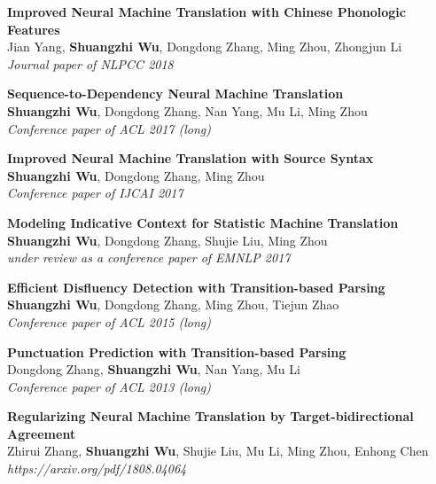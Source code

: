 \documentclass{resume}
\begin{document}
\normalsize \textbf{Improved Neural Machine Translation with Chinese Phonologic Features} \\
\small Jian Yang, \textbf{Shuangzhi Wu}, Dongdong Zhang, Ming Zhou, Zhongjun Li\\
\small \textit{Journal paper of NLPCC 2018}

\normalsize \textbf{Sequence-to-Dependency Neural Machine Translation} \\
\small \textbf{Shuangzhi Wu}, Dongdong Zhang, Nan Yang, Mu Li, Ming Zhou\\
\small \textit{Conference paper of ACL 2017 (long)}

\normalsize \textbf{Improved Neural Machine Translation with Source Syntax} \\
\small \textbf{Shuangzhi Wu}, Dongdong Zhang, Ming Zhou\\
\small \textit{Conference paper of IJCAI 2017}

\normalsize \textbf{Modeling Indicative Context for Statistic Machine Translation} \\
\small \textbf{Shuangzhi Wu}, Dongdong Zhang, Shujie Liu, Ming Zhou\\
\small \textit{under review as a conference paper of EMNLP 2017}

\normalsize \textbf{Efficient Disfluency Detection with Transition-based Parsing} \\
\small \textbf{Shuangzhi Wu}, Dongdong Zhang, Ming Zhou, Tiejun Zhao\\
\small \textit{Conference paper of ACL 2015 (long)}

\normalsize \textbf{Punctuation Prediction with Transition-based Parsing} \\
\small Dongdong Zhang, \textbf{Shuangzhi Wu}, Nan Yang, Mu Li\\
\small \textit{Conference paper of ACL 2013 (long)}

\normalsize \textbf{Regularizing Neural Machine Translation by Target-bidirectional Agreement} \\
\small Zhirui Zhang, \textbf{Shuangzhi Wu}, Shujie Liu, Mu Li, Ming Zhou, Enhong Chen\\
\small \textit{https://arxiv.org/pdf/1808.04064}

\end{document}
